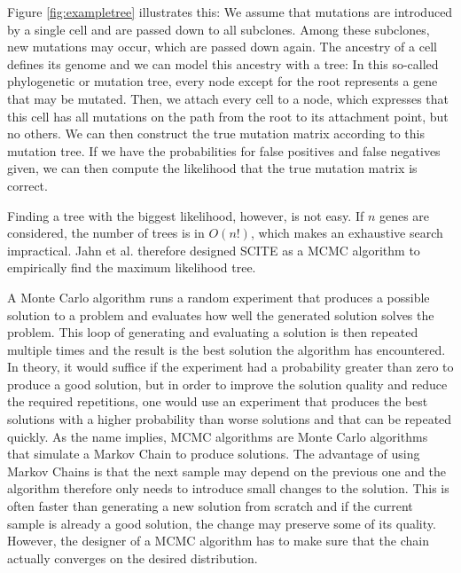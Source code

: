 
Figure \ref{fig:exampletree} illustrates this: We assume that mutations are introduced by a single cell and are passed down to all subclones. Among these subclones, new mutations may occur, which are passed down again. The ancestry of a cell defines its genome and we can model this ancestry with a tree: In this so-called phylogenetic or mutation tree, every node except for the root represents a gene that may be mutated. Then, we attach every cell to a node, which expresses that this cell has all mutations on the path from the root to its attachment point, but no others. We can then construct the true mutation matrix according to this mutation tree. If we have the probabilities for false positives and false negatives given, we can then compute the likelihood that the true mutation matrix is correct. 


Finding a tree with the biggest likelihood, however, is not easy. If $n$ genes are considered, the number of trees is in $O(n!)$, which makes an exhaustive search impractical. Jahn et al. therefore designed \ac{SCITE} as a \ac{MCMC} algorithm to empirically find the maximum likelihood tree.


A Monte Carlo algorithm runs a random experiment that produces a possible solution to a problem and evaluates how well the generated solution solves the problem. This loop of generating and evaluating a solution is then repeated multiple times and the result is the best solution the algorithm has encountered. In theory, it would suffice if the experiment had a probability greater than zero to produce a good solution, but in order to improve the solution quality and reduce the required repetitions, one would use an experiment that produces the best solutions with a higher probability than worse solutions and that can be repeated quickly. As the name implies, \ac{MCMC} algorithms are Monte Carlo algorithms that simulate a Markov Chain to produce solutions. The advantage of using Markov Chains is that the next sample may depend on the previous one and the algorithm therefore only needs to introduce small changes to the solution. This is often faster than generating a new solution from scratch and if the current sample is already a good solution, the change may preserve some of its quality. However, the designer of a \ac{MCMC} algorithm has to make sure that the chain actually converges on the desired distribution.

